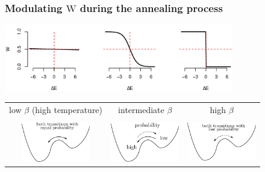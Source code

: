 \begin{frame} \frametitle{Modulating $\mathrm W$ during the annealing process}
  \begin{center}
    \includegraphics[width=10cm]{img/switchfuns}
\vspace{5mm}
  \oident\oident\begin{tabular}[h]{c c c}
    low $\beta$ (high temperature) & intermediate $\beta$  & high $\beta$\\\\
    \includegraphics[width=3cm]{img/section3_fig4}
    & \hspace{-0.5cm}\includegraphics[width=3cm]{img/section3_fig5}
    & \includegraphics[width=3cm]{img/section3_fig6}
  \end{tabular}
\vspace{5mm}
  \end{center}
  \vspace{-2cm}

\\

\end{frame}

